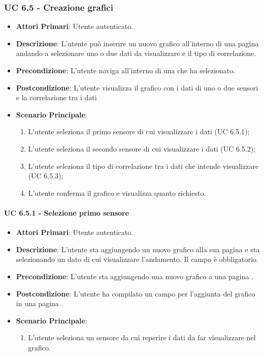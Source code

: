 			\subsubsection{UC 6.5 - Creazione grafici }
			\begin{itemize}
				\item \textbf{Attori Primari}: Utente autenticato.
				\item \textbf{Descrizione}: L'utente può inserire un nuovo grafico all'interno di una pagina  andando a selezionare uno o due dati da visualizzare e il tipo di correlazione.
				\item \textbf{Precondizione}: L'utente naviga all'interno di una  che ha selezionato.
				\item \textbf{Postcondizione}: L'utente visualizza il grafico con i dati di uno o due sensori e la correlazione tra i dati
				\item \textbf{Scenario Principale}:
				\begin{enumerate}
					\item{L'utente seleziona il primo sensore di cui visualizzare i dati (UC 6.5.1);}
					\item{L'utente seleziona il secondo sensore di cui visualizzare i dati (UC 6.5.2);}
					\item{L'utente seleziona il tipo di correlazione tra i dati che intende visualizzare (UC 6.5.3);}
					\item{L'utente conferma il grafico e visualizza quanto richiesto.}
				\end{enumerate}	
			\end{itemize}

			\paragraph{UC 6.5.1 - Selezione primo sensore}
			\begin{itemize}
				\item \textbf{Attori Primari}: Utente autenticato.
				\item \textbf{Descrizione}: L'utente sta aggiungendo un nuovo grafico alla sua pagina  e sta selezionando un dato di cui visualizzare l'andamento. Il campo è obbligatorio.
				\item \textbf{Precondizione}: L'utente sta aggiungendo una nuovo grafico a una pagina .
				\item \textbf{Postcondizione}: L'utente ha compilato un campo per l'aggiunta del grafico in una pagina .
				\item \textbf{Scenario Principale}:
				\begin{enumerate}
					\item{L'utente seleziona un sensore da cui reperire i dati da far visualizzare nel grafico.}
				\end{enumerate}	
			\end{itemize}

